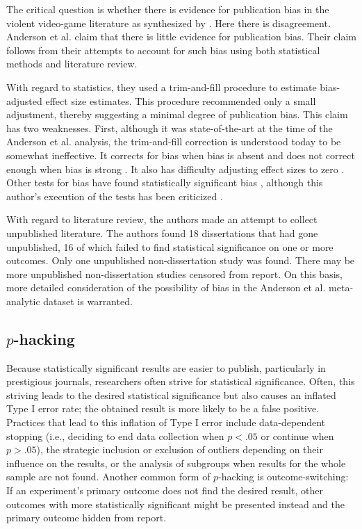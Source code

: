 \documentclass[man, mask]{apa6}
\begin{document}
The critical question is whether there is evidence for publication bias in the violent video-game literature as synthesized by \citet{Anderson:etal:2010}.  Here there is disagreement.  Anderson et al. claim that there is little evidence for publication bias.  Their claim follows from their attempts to account for such bias using both statistical methods and literature review.  

With regard to statistics, they used a  trim-and-fill procedure to estimate bias-adjusted effect size estimates. This procedure recommended only a small adjustment, thereby suggesting a minimal degree of publication bias. This claim has two weaknesses. First, although it was state-of-the-art at the time of the Anderson et al. analysis, the trim-and-fill correction is understood today to be somewhat ineffective. It corrects for bias when bias is absent and does not correct enough when bias is strong \citep{Simonsohn:etal:2014b}. It also has difficulty adjusting effect sizes to zero \citep{CITATION NEEDED!}. Other tests for bias have found statistically significant  bias \citep{Ferguson:2007}, although this author's execution of the tests has been criticized \citep[see][]{Anderson:etal:2010}. 

With regard to literature review, the authors made an attempt to collect unpublished literature. The authors found 18 dissertations that had gone unpublished, 16 of which failed to find statistical significance on one or more outcomes. Only one unpublished non-dissertation study was found. There may be more unpublished non-dissertation studies censored from report. On this basis, more detailed consideration of the possibility of bias in the Anderson et al. meta-analytic dataset is warranted.

\subsection{$p$-hacking}
Because statistically significant results are easier to publish, particularly in prestigious journals, researchers often strive for statistical significance. Often, this striving leads to the desired statistical significance but also causes an inflated Type I error rate; the obtained result is more likely to be a false positive. Practices that lead to this inflation of Type I error include data-dependent stopping (i.e., deciding to end data collection when $p < .05$ or continue when $p > .05$), the strategic inclusion or exclusion of outliers depending on their influence on the results, or the analysis of subgroups when results for the whole sample are not found. Another common form of $p$-hacking is outcome-switching: If an experiment's primary outcome does not find the desired result, other outcomes with more statistically significant might be presented instead and the primary outcome hidden from report.
\end{document}
